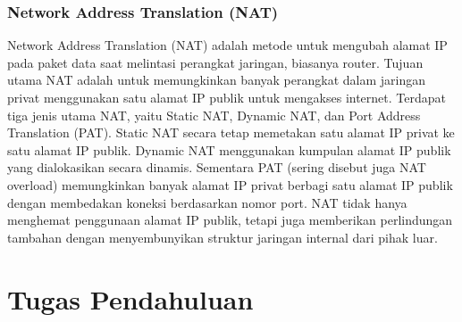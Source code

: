 \subsubsection{Network Address Translation (NAT)}

Network Address Translation (NAT) adalah metode untuk mengubah alamat IP pada paket data saat melintasi perangkat jaringan, biasanya router. Tujuan utama NAT adalah untuk memungkinkan banyak perangkat dalam jaringan privat menggunakan satu alamat IP publik untuk mengakses internet. Terdapat tiga jenis utama NAT, yaitu Static NAT, Dynamic NAT, dan Port Address Translation (PAT). Static NAT secara tetap memetakan satu alamat IP privat ke satu alamat IP publik. Dynamic NAT menggunakan kumpulan alamat IP publik yang dialokasikan secara dinamis. Sementara PAT (sering disebut juga NAT overload) memungkinkan banyak alamat IP privat berbagi satu alamat IP publik dengan membedakan koneksi berdasarkan nomor port. NAT tidak hanya menghemat penggunaan alamat IP publik, tetapi juga memberikan perlindungan tambahan dengan menyembunyikan struktur jaringan internal dari pihak luar.



\section{Tugas Pendahuluan}

